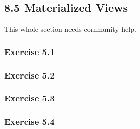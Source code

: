 \documentclass[../../main.tex]{subfiles}
\begin{document}
\subsection{8.5 Materialized Views}


This whole section needs community help.

\subsubsection*{Exercise 5.1}

\subsubsection*{Exercise 5.2}

\subsubsection*{Exercise 5.3}

\subsubsection*{Exercise 5.4}
\end{document}
